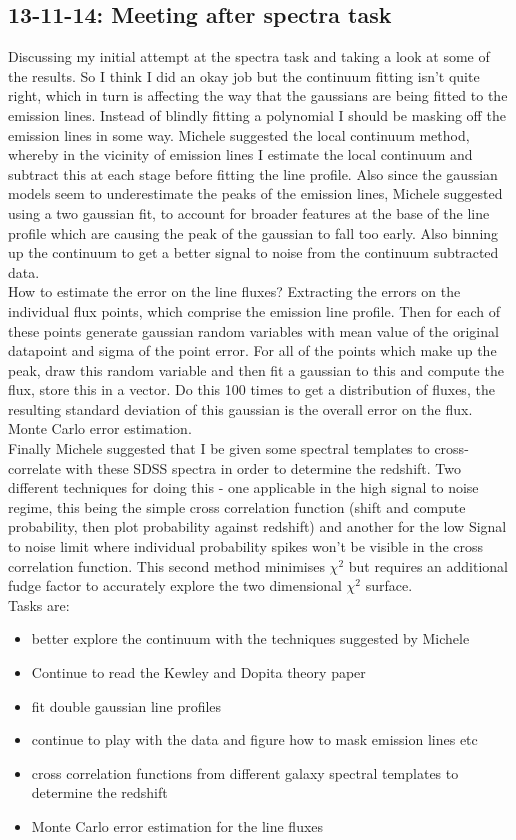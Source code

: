 \documentclass{literature}
\begin{document}
\subsection{13-11-14: Meeting after spectra task}\label{Meeting_4}
Discussing my initial attempt at the spectra task and taking a look at some of the results. So I think I did an okay job but the continuum fitting isn't quite right, which in turn is affecting the way that the gaussians are being fitted to the emission lines. Instead of blindly fitting a polynomial I should be masking off the emission lines in some way. Michele suggested the local continuum method, whereby in the vicinity of emission lines I estimate the local continuum and subtract this at each stage before fitting the line profile. Also since the gaussian models seem to underestimate the peaks of the emission lines, Michele suggested using a two gaussian fit, to account for broader features at the base of the line profile which are causing the peak of the gaussian to fall too early. Also binning up the continuum to get a better signal to noise from the continuum subtracted data. \\
How to estimate the error on the line fluxes? Extracting the errors on the individual flux points, which comprise the emission line profile. Then for each of these points generate gaussian random variables with mean value of the original datapoint and sigma of the point error. For all of the points which make up the peak, draw this random variable and then fit a gaussian to this and compute the flux, store this in a vector. Do this 100 times to get a distribution of fluxes, the resulting standard deviation of this gaussian is the overall error on the flux. Monte Carlo error estimation. \\ 
Finally Michele suggested that I be given some spectral templates to cross-correlate with these SDSS spectra in order to determine the redshift. Two different techniques for doing this - one applicable in the high signal to noise regime, this being the simple cross correlation function (shift and compute probability, then plot probability against redshift) and another for the low Signal to noise limit where individual probability spikes won't be visible in the cross correlation function. This second method minimises $\chi ^{2}$ but requires an additional fudge factor to accurately explore the two dimensional $\chi ^{2}$ surface. \\ 
Tasks are: 

\begin{itemize}
	\item better explore the continuum with the techniques suggested by Michele 
	\item Continue to read the Kewley and Dopita theory paper 
	\item fit double gaussian line profiles 
	\item continue to play with the data and figure how to mask emission lines etc 
	\item cross correlation functions from different galaxy spectral templates to determine the redshift
	\item Monte Carlo error estimation for the line fluxes
\end{itemize}
\end{document}
